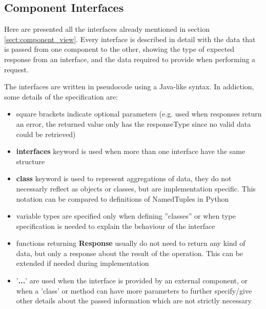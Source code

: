 \clearpage
\subsection{Component Interfaces}
Here are presented all the interfaces already mentioned in section \ref{sect:component_view}. Every interface is described in detail with the data that is passed from one component to the other, showing the type of expected response from an interface, and the data required to provide when performing a request.

The interfaces are written in pseudocode using a Java-like syntax. In addiction, some details of the specification are:
\begin{itemize}
    \item square brackets indicate optional parameters (e.g. used when responses return an error, the returned value only has the responseType since no valid data could be retrieved)
    \item \textbf{interfaces} keyword is used when more than one interface have the same structure
    \item \textbf{class} keyword is used to represent aggregations of data, they do not necessarly reflect as objects or classes, but are implementation specific. This notation can be compared to definitions of NamedTuples in Python
    \item variable types are specified only when defining ''classes'' or when type specification is needed to explain the behaviour of the interface
    \item functions returning \textbf{Response} usually do not need to return any kind of data, but only a response about the result of the operation. This can be extended if needed during implementation
    \item '\textbf{...}' are used when the interface is provided by an external component, or when a 'class' or method can have more parameters to further specify/give other details about the passed information which are not strictly necessary
\end{itemize}




